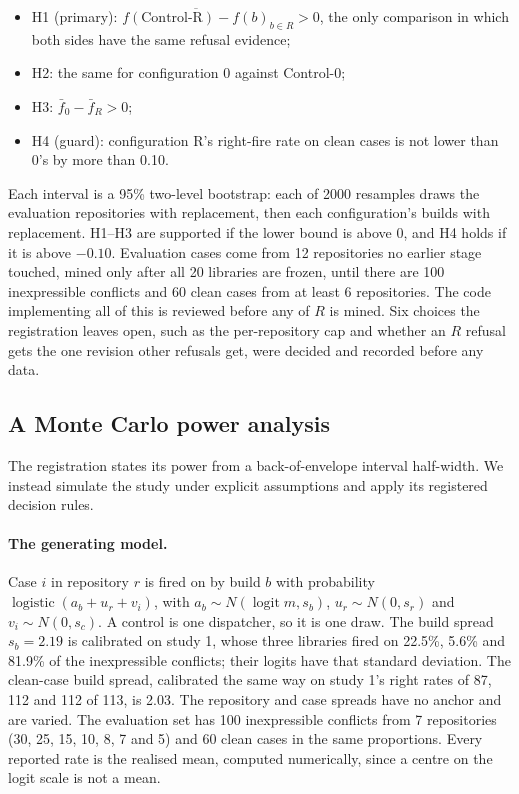 \documentclass[11pt]{article}
\begin{document}
\begin{itemize}
  \item H1 (primary): $\overline{f(\text{Control-R}) - f(b)}_{b\in R} > 0$, the only comparison
  in which both sides have the same refusal evidence;
  \item H2: the same for configuration 0 against Control-0;
  \item H3: $\bar f_0 - \bar f_R > 0$;
  \item H4 (guard): configuration R's right-fire rate on clean cases is not lower than 0's by
  more than 0.10.
\end{itemize}

Each interval is a 95\% two-level bootstrap: each of 2000 resamples draws the evaluation
repositories with replacement, then each configuration's builds with replacement. H1--H3 are
supported if the lower bound is above 0, and H4 holds if it is above $-0.10$. Evaluation cases
come from 12 repositories no earlier stage touched, mined only after all 20 libraries are frozen,
until there are 100 inexpressible conflicts and 60 clean cases from at least 6 repositories. The
code implementing all of this is reviewed before any of $R$ is mined. Six choices the registration
leaves open, such as the per-repository cap and whether an $R$ refusal gets the one revision
other refusals get, were decided and recorded before any data.

\subsection{A Monte Carlo power analysis}

The registration states its power from a back-of-envelope interval half-width. We instead
simulate the study under explicit assumptions and apply its registered decision rules.

\paragraph{The generating model.}
Case $i$ in repository $r$ is fired on by build $b$ with probability
$\operatorname{logistic}(a_b+u_r+v_i)$, with $a_b\sim N(\operatorname{logit} m, s_b)$, $u_r\sim
N(0,s_r)$ and $v_i\sim N(0,s_c)$. A control is one dispatcher, so it is one draw. The build
spread $s_b=2.19$ is calibrated on study 1, whose three libraries fired on 22.5\%, 5.6\% and
81.9\% of the inexpressible conflicts; their logits have that standard deviation. The clean-case
build spread, calibrated the same way on study 1's right rates of 87, 112 and 112 of 113, is
2.03. The repository and case spreads have no anchor and are varied. The evaluation set has 100
inexpressible conflicts from 7 repositories (30, 25, 15, 10, 8, 7 and 5) and 60 clean cases in
the same proportions. Every reported rate is the realised mean, computed numerically, since a
centre on the logit scale is not a mean.
\end{document}

